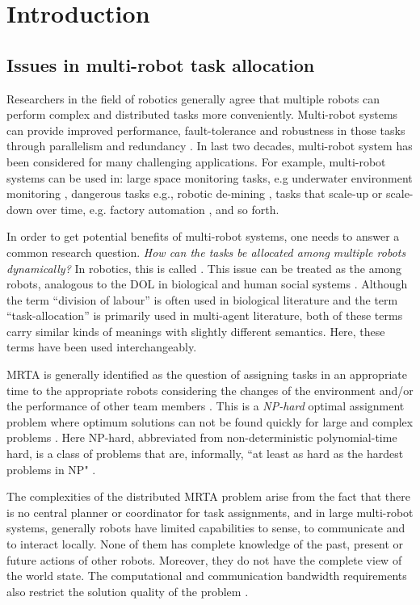 \chapter{Introduction}
\label{intro}
\section{Issues in multi-robot task allocation}
\label{intro:mrta}
Researchers in the field of robotics generally agree that multiple robots can perform complex and distributed tasks more conveniently. Multi-robot systems can provide improved performance, fault-tolerance and robustness in those tasks through parallelism and redundancy \cite{Arkin1998,Parker+2006}. In last two decades, multi-robot system has been considered for many challenging applications. For example, multi-robot systems can be used in: large space monitoring tasks, e.g underwater environment monitoring \cite{Eriksen+2001}, dangerous tasks e.g., robotic de-mining \cite{Dunbar+2002}, tasks that scale-up or scale-down over time, e.g. factory automation \cite{Wurman+2008}, and so forth.

In order to get potential benefits of multi-robot systems,  one needs to answer a common research question. \textit{How can the tasks be allocated among multiple robots dynamically?} In robotics, this is called  \cite{Gerkey+2004}. This issue can be treated as the  among robots, analogous to the DOL in biological and human social systems \cite{Sendova-Franks+1999}. Although the term ``division of labour'' is often used in biological literature and the term ``task-allocation'' is primarily used in multi-agent literature, both of these terms carry similar kinds of meanings with slightly different semantics. Here, these terms have been used interchangeably.

MRTA is generally identified as the question of assigning tasks in an appropriate time to the appropriate robots considering the changes of the environment and/or the performance of other team members \cite{Gerkey+2003}. This is a {\em NP-hard} optimal assignment problem where optimum solutions can not be found quickly for large and complex problems \cite{Parker2008}. Here NP-hard, abbreviated from non-deterministic polynomial-time hard,  is a class of problems that are, informally, ``at least as hard as the hardest problems in NP" \cite{garey1979computers}.

The complexities of the distributed MRTA problem arise from the fact that there is no central planner or coordinator for task assignments, and in large multi-robot systems, generally robots have limited capabilities to sense, to communicate and to interact locally. None of them has complete knowledge of the past, present or future actions of other robots. Moreover, they do not have the complete view of the world state. The computational and communication bandwidth requirements also restrict the solution quality of the problem \cite{Gerkey+2004}.


